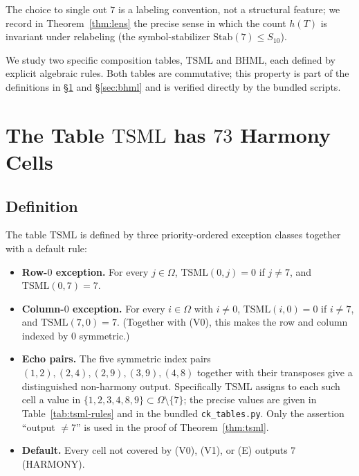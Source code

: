\documentclass[11pt,reqno]{amsart}
\theoremstyle{plain}
\theoremstyle{definition}
\theoremstyle{remark}
\newcommand{\TSML}{\mathrm{TSML}}
\newcommand{\BHML}{\mathrm{BHML}}
\begin{document}
The choice to single out $7$ is a labeling convention, not a
structural feature; we record in
Theorem~\ref{thm:lens} the precise sense in which the count $h(T)$
is invariant under relabeling (the symbol-stabilizer
$\mathrm{Stab}(7) \le S_{10}$).

We study two specific composition tables, $\TSML$ and $\BHML$,
each defined by explicit algebraic rules. Both tables are
commutative; this property is part of the definitions in
\S\ref{sec:tsml} and \S\ref{sec:bhml} and is verified directly by
the bundled scripts.

\section{The Table $\TSML$ has $73$ Harmony Cells}\label{sec:tsml}

\subsection{Definition}

The table $\TSML$ is defined by three priority-ordered exception
classes together with a default rule:

\begin{itemize}\setlength\itemsep{2pt}
\item[(V0)] \textbf{Row-$0$ exception.} For every $j \in \Omega$,
$\TSML(0, j) = 0$ if $j \ne 7$, and $\TSML(0, 7) = 7$.
\item[(V1)] \textbf{Column-$0$ exception.} For every $i \in
\Omega$ with $i \ne 0$, $\TSML(i, 0) = 0$ if $i \ne 7$, and
$\TSML(7, 0) = 7$. (Together with (V0), this makes the row and
column indexed by $0$ symmetric.)
\item[(E)] \textbf{Echo pairs.} The five symmetric index pairs
$(1,2), (2,4), (2,9), (3,9), (4,8)$ together with their
transposes give a distinguished non-harmony output. Specifically
$\TSML$ assigns to each such cell a value in
$\{1, 2, 3, 4, 8, 9\} \subset \Omega \setminus \{7\}$; the
precise values are given in Table~\ref{tab:tsml-rules} and in
the bundled \texttt{ck\_tables.py}. Only the assertion
``output $\ne 7$'' is used in the proof of
Theorem~\ref{thm:tsml}.
\item[(D)] \textbf{Default.} Every cell not covered by (V0),
(V1), or (E) outputs $7$ (HARMONY).
\end{itemize}
\end{document}
